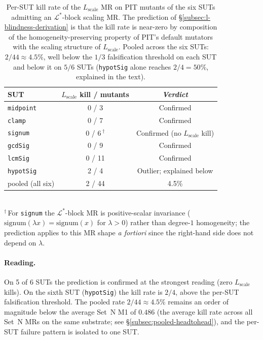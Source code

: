 \begin{table}[h]
\centering
\caption{Per-SUT kill rate of the $L_{\mathrm{scale}}$ MR on PIT
mutants of the six SUTs admitting an $\mathcal{L}^{*}$-block scaling
MR. The prediction of \S\ref{subsec:l-blindness-derivation} is that
the kill rate is near-zero by composition of the
homogeneity-preserving property of PIT's default mutators with the
scaling structure of $L_{\mathrm{scale}}$. Pooled across the six SUTs:
$2/44 \approx 4.5\%$, well below the $1/3$ falsification threshold on
each SUT and below it on $5/6$ SUTs (\texttt{hypotSig} alone reaches
$2/4 = 50\%$, explained in the text).}
\label{tab:l-blindness}
\small
\begin{tabular}{lcc}
\toprule
SUT & $L_{\mathrm{scale}}$ kill / mutants & \emph{Verdict} \\
\midrule
\texttt{midpoint}  &  0 / 3   & Confirmed \\
\texttt{clamp}     &  0 / 7   & Confirmed \\
\texttt{signum}    &  0 / 6\,$^{\dagger}$ & Confirmed (no $L_{\mathrm{scale}}$ kill) \\
\texttt{gcdSig}    &  0 / 9   & Confirmed \\
\texttt{lcmSig}    &  0 / 11  & Confirmed \\
\texttt{hypotSig}  &  2 / 4   & Outlier; explained below \\
\midrule
pooled (all six)   &  2 / 44   & 4.5\% \\
\bottomrule
\end{tabular}\\[0.4em]
{\footnotesize $^{\dagger}$\,For \texttt{signum} the $\mathcal{L}^{*}$-block MR
is positive-scalar invariance ($\mathrm{signum}(\lambda x) = \mathrm{signum}(x)$
for $\lambda > 0$) rather than degree-$1$ homogeneity; the prediction
applies to this MR shape \emph{a fortiori} since the right-hand side
does not depend on $\lambda$.}
\end{table}

\paragraph{Reading.}
On 5 of 6 SUTs the prediction is confirmed at the strongest reading
(zero $L_{\mathrm{scale}}$ kills). On the sixth SUT
(\texttt{hypotSig}) the kill rate is $2/4$, above the per-SUT
falsification threshold. The pooled rate $2/44 \approx 4.5\%$ remains
an order of magnitude below the average Set~N M1 of $0.486$ (the
average kill rate across all Set~N MRs on the same substrate; see
\S\ref{subsec:pooled-headtohead}), and the per-SUT failure pattern is
isolated to one SUT.

